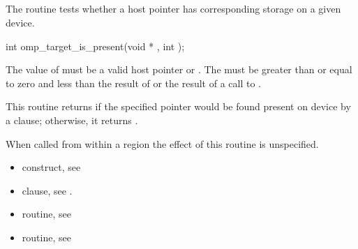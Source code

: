 \subsection{}
\label{subsec:omp_target_is_present}
\summary

The  routine tests whether a host pointer
has corresponding storage on a given device.

\format
\begin{boxedcode}
int omp\_target\_is\_present(void * , int );
\end{boxedcode}

\constraints

The value of  must be a valid host pointer or .
The 
must be greater than or equal to zero and less than the result of
 or the result of a call to
.

\effect

This routine returns  if the specified pointer
would be found present on device  by a 
clause; otherwise, it returns .

When called from within a  region 
the effect of this routine is unspecified.

\crossreferences
\begin{itemize}
\item {} construct, see 

\item {} clause, see .

\item {} routine, see 

\item {} routine, see 
\end{itemize}


\pagebreak
{}
\subsection{}
\label{subsec:omp_target_memcpy}
\summary

